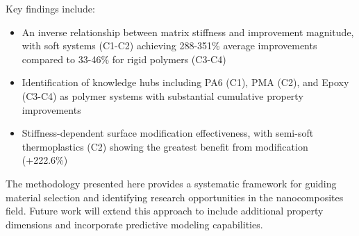 \documentclass[conference]{IEEEtran}
\begin{document}
Key findings include:
\begin{itemize}
\item An inverse relationship between matrix stiffness and improvement magnitude, with soft systems (C1-C2) achieving 288-351\% average improvements compared to 33-46\% for rigid polymers (C3-C4)
\item Identification of knowledge hubs including PA6 (C1), PMA (C2), and Epoxy (C3-C4) as polymer systems with substantial cumulative property improvements
\item Stiffness-dependent surface modification effectiveness, with semi-soft thermoplastics (C2) showing the greatest benefit from modification (+222.6\%)
\end{itemize}

The methodology presented here provides a systematic framework for guiding material selection and identifying research opportunities in the nanocomposites field. Future work will extend this approach to include additional property dimensions and incorporate predictive modeling capabilities.
\end{document}
